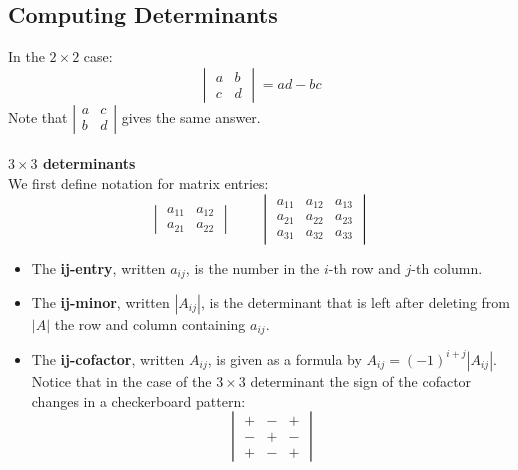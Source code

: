 \documentclass{report}
\begin{document}
\subsection{Computing Determinants}%
In the $2\times2$ case:
\begin{equation*}
\begin{vmatrix}
a & b\\
c & d
\end{vmatrix}
=ad-bc
\end{equation*}
Note that $\left|
\begin{smallmatrix}
a & c\\
b & d
\end{smallmatrix}\right|$ 
gives the same answer.\\
\vspace{1mm}\\
\textbf{$3\times3$ determinants}\\
We first define notation for matrix entries:
\begin{equation*}
\begin{vmatrix}
a_{11} & a_{12}\\
a_{21} & a_{22}
\end{vmatrix}\quad\quad
\begin{vmatrix}
a_{11} & a_{12} & a_{13}\\
a_{21} & a_{22} & a_{23}\\
a_{31} & a_{32} & a_{33}
\end{vmatrix}
\end{equation*}
\begin{itemize}
\item The \textbf{ij-entry}, written $a_{ij}$, is the number in the $i$-th row and $j$-th column.
\item The \textbf{ij-minor}, written $|A_{ij}|$, is the determinant that is left 
after deleting from $|A|$ the row and column containing $a_{ij}$.
\item The \textbf{ij-cofactor}, written $A_{ij}$, is given as a formula by 
$A_{ij}=(-1)^{i+j}|A_{ij}|$. Notice that in the case of the $3\times3$ determinant the
sign of the cofactor changes in a checkerboard pattern:
\begin{equation*}
\begin{vmatrix}
+ & - & +\\
- & + & -\\
+ & - & +
\end{vmatrix}
\end{equation*}
\end{itemize}
\end{document}
